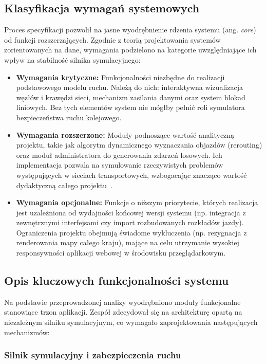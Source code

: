 \documentclass[twoside]{projektInzynierskiMS1z}
\begin{document}
\subsection{Klasyfikacja wymagań systemowych}

Proces specyfikacji pozwolił na jasne wyodrębnienie rdzenia systemu (ang. \emph{core})
od funkcji rozszerzających. Zgodnie z teorią projektowania systemów zorientowanych na
dane, wymagania podzielono na kategorie uwzględniające ich wpływ na stabilność silnika
symulacyjnego:

\begin{itemize}
\item \textbf{Wymagania krytyczne:} Funkcjonalności niezbędne do realizacji
podstawowego modelu ruchu. Należą do nich: interaktywna wizualizacja węzłów i krawędzi
sieci, mechanizm zasilania danymi oraz system blokad liniowych. Bez tych elementów
system nie mógłby pełnić roli symulatora bezpieczeństwa ruchu kolejowego.

\item \textbf{Wymagania rozszerzone:} Moduły podnoszące wartość analityczną projektu,
takie jak algorytm dynamicznego wyznaczania objazdów (rerouting) oraz moduł
administratora do generowania zdarzeń losowych. Ich implementacja pozwala na
symulowanie rzeczywistych problemów występujących w sieciach transportowych,
wzbogacając znacząco wartość dydaktyczną całego projektu~\cite{sommerville2016}.

\item \textbf{Wymagania opcjonalne:} Funkcje o niższym priorytecie, których realizacja
jest uzależniona od wydajności końcowej wersji systemu (np. integracja z zewnętrznymi
interfejsami czy import rozbudowanych rozkładów jazdy). Ograniczenia projektu obejmują
świadome wykluczenia (np. rezygnacja z renderowania mapy całego kraju), mające na celu
utrzymanie wysokiej responsywności aplikacji webowej w środowisku przeglądarkowym.
\end{itemize}

\subsection{Opis kluczowych funkcjonalności systemu}

Na podstawie przeprowadzonej analizy wyodrębniono moduły funkcjonalne stanowiące trzon
aplikacji. Zespół zdecydował się na architekturę opartą na niezależnym silniku
symulacyjnym, co wymagało zaprojektowania następujących mechanizmów:

\subsubsection{Silnik symulacyjny i zabezpieczenia ruchu}
\end{document}
